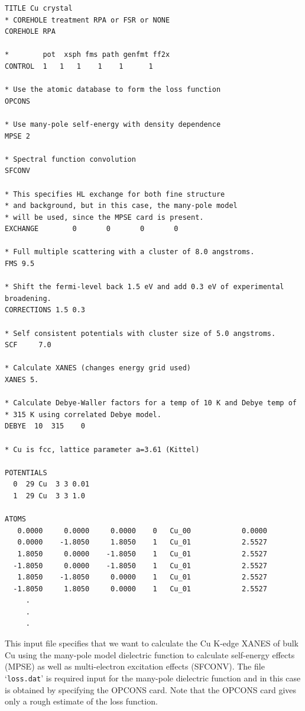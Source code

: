 \documentclass[11pt,oneside]{report} %
\newcommand{\file}[1]{`\texttt{#1}'}
\begin{document}
\begin{verbatim}
TITLE Cu crystal
* COREHOLE treatment RPA or FSR or NONE
COREHOLE RPA

*        pot  xsph fms path genfmt ff2x
CONTROL  1   1   1    1    1      1

* Use the atomic database to form the loss function
OPCONS

* Use many-pole self-energy with density dependence
MPSE 2

* Spectral function convolution
SFCONV

* This specifies HL exchange for both fine structure
* and background, but in this case, the many-pole model
* will be used, since the MPSE card is present.
EXCHANGE        0       0       0       0

* Full multiple scattering with a cluster of 8.0 angstroms.
FMS 9.5

* Shift the fermi-level back 1.5 eV and add 0.3 eV of experimental broadening.
CORRECTIONS 1.5 0.3

* Self consistent potentials with cluster size of 5.0 angstroms.
SCF     7.0

* Calculate XANES (changes energy grid used)
XANES 5.

* Calculate Debye-Waller factors for a temp of 10 K and Debye temp of
* 315 K using correlated Debye model.
DEBYE  10  315    0

* Cu is fcc, lattice parameter a=3.61 (Kittel)

POTENTIALS
  0  29 Cu  3 3 0.01
  1  29 Cu  3 3 1.0

ATOMS
   0.0000     0.0000     0.0000    0   Cu_00            0.0000
   0.0000    -1.8050     1.8050    1   Cu_01            2.5527
   1.8050     0.0000    -1.8050    1   Cu_01            2.5527
  -1.8050     0.0000    -1.8050    1   Cu_01            2.5527
   1.8050    -1.8050     0.0000    1   Cu_01            2.5527
  -1.8050     1.8050     0.0000    1   Cu_01            2.5527
     .
     .
     .
\end{verbatim}

This input file specifies that we want to calculate the Cu K-edge
XANES of bulk Cu using the many-pole model dielectric function to
calculate self-energy effects (MPSE) as well as multi-electron
excitation effects (SFCONV). The file \file{loss.dat} is required input for the many-pole
dielectric function and in this case is obtained by specifying the
OPCONS card. Note that the OPCONS card gives only a rough
estimate of the loss function.
\end{document}
